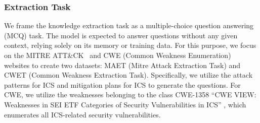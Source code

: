 \documentclass[conference]{IEEEtran}
\begin{document}
\begin{table}[]
\caption{Sample MCQs and Answers from MAET and CWET}
\label{tab:mcq-sample}
\centering
{}

\end{table}

\subsubsection{Extraction Task}\label{sec:extractiontask}
We frame the knowledge extraction task as a multiple-choice question answering (MCQ) task. The model is expected to answer questions without any given context, relying solely on its memory or training data. For this purpose, we focus on the MITRE ATT\&CK~\cite{mitreOrg} and CWE (Common Weakness Enumeration)~\cite{cwe1358} websites to create two datasets: MAET (Mitre Attack Extraction Task) and CWET (Common Weakness Extraction Task). Specifically, we utilize the attack patterns for ICS \cite{mitre-techniques} and mitigation plans for ICS \cite{mitre-mitigations} to generate the questions. For CWE, we utilize the weaknesses belonging to the class CWE-1358 ``CWE VIEW: Weaknesses in SEI ETF Categories of Security Vulnerabilities in ICS'' \cite{cwe1358}, which enumerates all ICS-related security vulnerabilities.
\end{document}
